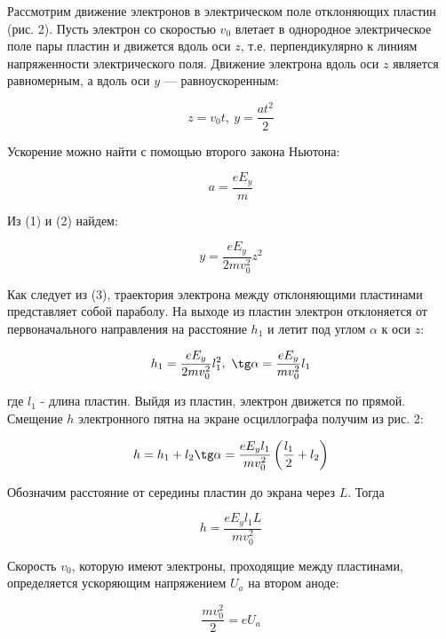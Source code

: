 \documentclass[14pt]{article}
\begin{document}
Рассмотрим движение электронов в электрическом поле отклоняющих пластин (рис. 2). Пусть электрон со скоростью $v_0$ влетает в однородное электрическое поле пары пластин и движется вдоль оси $z$, т.е. перпендикулярно к линиям напряженности электрического поля. Движение электрона вдоль оси $z$ является равномерным, а вдоль оси $y$ --- равноускоренным:

\begin{equation}
z = v_0t,~
y = \frac{at^2}{2}
\end{equation}

Ускорение можно найти с помощью второго закона Ньютона:

\begin{equation}
a = \frac{eE_y}{m}
\end{equation}

\noindent Из (1) и (2) найдем:

\begin{equation}
y = \frac{eE_y}{2mv_0^2}z^2
\end{equation}

\noindent Как следует из (3), траектория электрона между отклоняющими пластинами представляет собой параболу. На выходе из пластин электрон отклоняется от первоначального направления на расстояние $h_1$ и летит под углом $\alpha$ к оси $z$:

\begin{equation}
h_1 = \frac{eE_y}{2mv_0^2}l_1^2,~ \tg \alpha = \frac{eE_y}{mv_0^2}l_1
\end{equation}

\noindent где $l_1$ - длина пластин. Выйдя из пластин, электрон движется по прямой. Смещение $h$ электронного пятна на экране осциллографа получим из рис. 2:

\begin{equation}
h = h_1 + l_2\tg \alpha = \frac{eE_yl_1}{mv_0^2}\left(\frac{l_1}{2}+l_2\right)
\end{equation}

Обозначим расстояние от середины пластин до экрана через $L$. Тогда

\begin{equation}
h =  \frac{eE_yl_1L}{mv_0^2}
\end{equation}

Скорость $v_0$, которую имеют электроны, проходящие между пластинами, определяется ускоряющим напряжением $U_a$ на втором аноде:

\begin{equation}
\frac{mv_0^2}{2} = eU_a
\end{equation}
\end{document}
